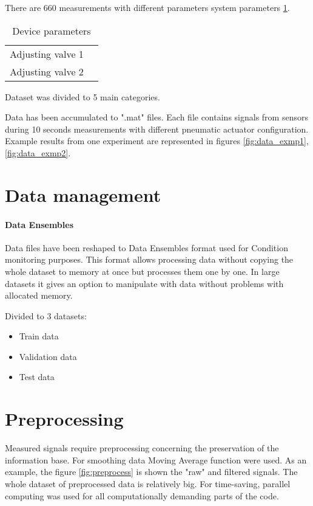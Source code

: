 There are 660 measurements with different parameters system parameters \ref{tab:params}.

\begin{table}[h]
    \centering
    \begin{tabular}{|c|c|}
        \hline
        Adjusting valve 1 &  \\
        Adjusting valve 2 &  \\
        \hline
    \end{tabular}
    \caption{Device parameters}
    \label{tab:params}
\end{table}

Dataset was divided to 5 main categories.


Data has been accumulated to ".mat" files.
Each file contains signals from sensors during 10 seconds measurements with
different pneumatic actuator configuration. Example results from one
experiment are represented in figures \ref{fig:data_exmp1},
\ref{fig:data_exmp2}. 


\section{Data management}
\paragraph{Data Ensembles}
Data files have been reshaped to Data Ensembles format used for Condition
monitoring purposes. This format allows processing data without copying the
whole dataset to memory at once but processes them one by one. In large datasets
it gives an option to manipulate with data without problems with allocated memory.

Divided to 3 datasets:
\begin{itemize}
    \item Train data
    \item Validation data
    \item Test data
\end{itemize}

\section{Preprocessing}
Measured signals require preprocessing concerning the preservation of the information
base. For smoothing data Moving Average function were used.
As an example, the figure \ref{fig:preprocess} is shown the "raw" and filtered signals.
The whole dataset of preprocessed data is relatively big. For
time-saving, parallel computing was used for all computationally
demanding parts of the code.



